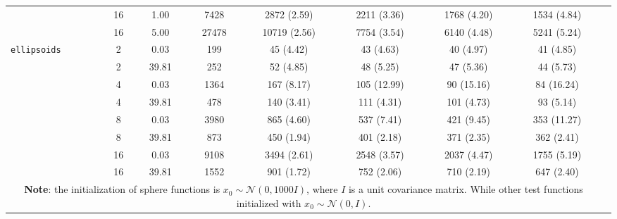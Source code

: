 \begin{table*}
\begin{tabular}{ l*{8}{c}}
&    16 &    1.00 &    7428 &    2872 (2.59) & 2211 (3.36) & 1768 (4.20) & 1534 (4.84) \\ 
    
&    16 &    5.00 &    27478 &    10719 (2.56) & 7754 (3.54) & 6140 (4.48) & 5241 (5.24) \\ 
    

\toprule  %

\texttt{ellipsoids}

&    2 &    0.03 &    199 &    45 (4.42) & 43 (4.63) & 40 (4.97) & 41 (4.85) \\ 
    
&    2 &    39.81 &    252 &    52 (4.85) & 48 (5.25) & 47 (5.36) & 44 (5.73) \\ 
    
&    4 &    0.03 &    1364 &    167 (8.17) & 105 (12.99) & 90 (15.16) & 84 (16.24) \\ 
    
&    4 &    39.81 &    478 &    140 (3.41) & 111 (4.31) & 101 (4.73) & 93 (5.14) \\ 
    
&    8 &    0.03 &    3980 &    865 (4.60) & 537 (7.41) & 421 (9.45) & 353 (11.27) \\ 
    
&    8 &    39.81 &    873 &    450 (1.94) & 401 (2.18) & 371 (2.35) & 362 (2.41) \\ 
    
&    16 &    0.03 &    9108 &    3494 (2.61) & 2548 (3.57) & 2037 (4.47) & 1755 (5.19) \\ 
    
&    16 &    39.81 &    1552 &    901 (1.72) & 752 (2.06) & 710 (2.19) & 647 (2.40) \\ 
    
\bottomrule  
\multicolumn{8}{c}{\footnotesize \textbf{Note}: the initialization of sphere functions is $x_0 \sim \mathcal{N} (0,1000I)$, where $I$ is a unit covariance matrix. While other test functions initialized with $x_0 \sim \mathcal{N} (0,I) $.} 
\end{tabular}
\label{Tab:speed-ups}
\end{table*}